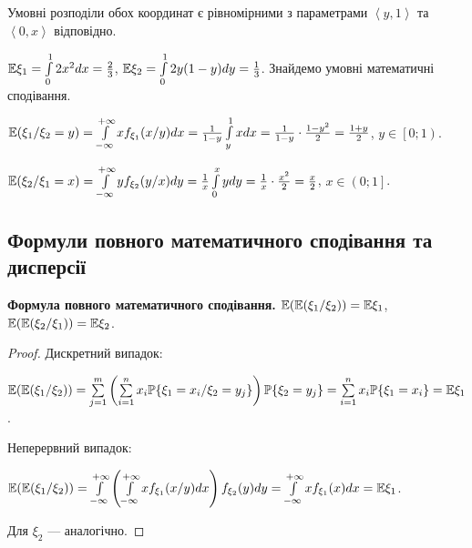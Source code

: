 \begin{example}
    Умовні розподіли обох координат є рівномірними з параметрами $\left< y, 1\right>$ та $\left<0, x\right>$ відповідно.

    $\mathbb{E}\xi_1 = \int\limits_0^1 2x^2 dx = \frac{2}{3}$,
    $\mathbb{E}\xi_2 = \int\limits_0^1 2y(1-y) dy = \frac{1}{3}$.
    Знайдемо умовні математичні сподівання.

    $\mathbb{E}(\xi_1 / \xi_2 = y) = \int\limits_{-\infty}^{+\infty} x f_{\xi_1}(x/y)dx =
    \frac{1}{1-y} \int\limits_y^1 x dx = \frac{1}{1-y} \cdot \frac{1-y^2}{2} = \frac{1+y}{2}$, $y \in \left[ 0; 1\right)$.

    $\mathbb{E}(\xi_2 / \xi_1 = x) = \int\limits_{-\infty}^{+\infty} y f_{\xi_2}(y/x)dy = 
    \frac{1}{x} \int\limits_0^x y dy = \frac{1}{x} \cdot \frac{x^2}{2} = \frac{x}{2}$, $x \in \left( 0; 1\right]$.
\end{example}
\subsection{Формули повного математичного сподівання та дисперсії}
\noindent\textbf{Формула повного математичного сподівання.}
    $\mathbb{E}(\mathbb{E}(\xi_1 / \xi_2)) = \mathbb{E}\xi_1$, $\mathbb{E}(\mathbb{E}(\xi_2 / \xi_1)) = \mathbb{E}\xi_2$.
\begin{proof}
    Дискретний випадок:

    $\mathbb{E}(\mathbb{E}(\xi_1 / \xi_2)) = \sum\limits_{j = 1}^m 
    \left(
        \sum\limits_{i=1}^n x_i \mathbb{P}\{\xi_1 = x_i / \xi_2 = y_j\}
    \right) \mathbb{P}\{\xi_2 = y_j\} = 
    \sum\limits_{i=1}^n x_i \mathbb{P}\{\xi_1 = x_i\} = \mathbb{E}\xi_1$.

    Неперервний випадок:

    $\mathbb{E}(\mathbb{E}(\xi_1 / \xi_2)) = \int\limits_{-\infty}^{+\infty} 
    \left(
        \int\limits_{-\infty}^{+\infty} x f_{\xi_1}(x / y) dx
    \right) f_{\xi_2}(y) dy
    = \int\limits_{-\infty}^{+\infty} x f_{\xi_1}(x) dx = \mathbb{E}\xi_1$.

    Для $\xi_2$ --- аналогічно.
\end{proof}

